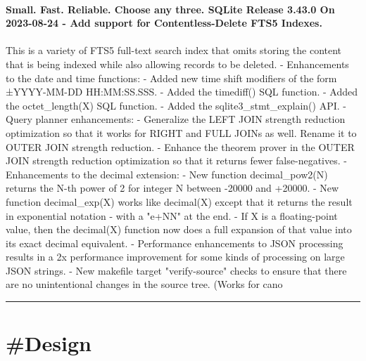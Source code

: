 \documentclass[10pt,a4paper]{article}
\begin{document}
\begin{multicols*}{2}
\paragraph{}
\textbf{Small. Fast. Reliable.
Choose any three.
SQLite Release 3.43.0 On 2023-08-24
- Add support for Contentless-Delete FTS5 Indexes.}
\paragraph{}
 This is a variety
of FTS5 full-text search index that omits storing the content that is being indexed
while also allowing records to be deleted.
- Enhancements to the date and time functions:
- Added new time shift modifiers of the form ±YYYY-MM-DD HH:MM:SS.SSS.
- Added the timediff() SQL function.
- Added the octet\_length(X) SQL function.
- Added the sqlite3\_stmt\_explain() API.
- Query planner enhancements:
- Generalize the LEFT JOIN strength reduction optimization so that it works
for RIGHT and FULL JOINs as well. Rename it to
OUTER JOIN strength reduction.
- Enhance the theorem prover in the OUTER JOIN strength reduction optimization
so that it returns fewer false-negatives.
- Enhancements to the decimal extension:
- New function decimal\_pow2(N) returns the N-th power of 2 for integer N
between -20000 and +20000.
- New function decimal\_exp(X) works like decimal(X) except that it returns
the result in exponential notation - with a "e+NN" at the end.
- If X is a floating-point value, then the decimal(X) function now does a full
expansion of that value into its exact decimal equivalent.
- Performance enhancements to JSON processing results in a 2x performance
improvement for some kinds of processing on large JSON strings.
- New makefile target "verify-source" checks to ensure that there are no
unintentional changes in the source tree. (Works for
cano
\par\noindent\textcolor{red}{\rule{\linewidth}{0.2mm}}
\vfill
\null
\end{multicols*}

\newpage
\section{\#Design}
\end{document}
